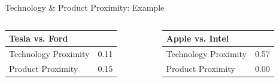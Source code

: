 \documentclass[
  10pt,
  aspectratio=169,   %
]{beamer}
\theoremstyle{plain}
\begin{document}
\begin{frame}{Technology \& Product Proximity: Example}
  \begin{columns}[T] %
    \begin{column}{0.45\textwidth} %
      \centering %
      \begin{tabular}{lr}
        \toprule
        Tesla vs. Ford       &      \\
        \midrule
        Technology Proximity & 0.11 \\
        Product Proximity    & 0.15 \\ %
        \bottomrule
      \end{tabular}
    \end{column}
    \begin{column}{0.45\textwidth} %
      \centering %
      \begin{tabular}{lr}
        \toprule
        Apple vs. Intel      &      \\
        \midrule
        Technology Proximity & 0.57 \\
        Product Proximity    & 0.00 \\ %
        \bottomrule
      \end{tabular}
    \end{column}
  \end{columns}
\end{frame}
\end{document}
